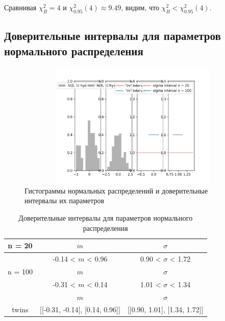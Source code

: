 \documentclass[main.tex]{subfiles}
\begin{document}
\noindent Сравнивая $\chi^{2}_{B} = 4$ и $\chi^{2}_{0.95}(4) \approx 9.49$, видим, что $\chi^{2}_{B} < \chi^{2}_{0.95}(4)$.

\FloatBarrier
\subsection{Доверительные интервалы для параметров нормального распределения}
\begin{figure}[ht]
	\centering
	\includegraphics[width = 18cm, height = 6cm]{../images/interval/8_1.png}
	\caption{Гистограммы нормальных распределений и доверительные интервалы их параметров}
	\label{w_pert1}
\end{figure}

\begin{table}[ht]
	\centering
	\begin{tabular}{| c | c | c |}
		\hline
		n = 20   &  $m$  & $\sigma$\\ \hline
		&  -0.14 < $m$ < 0.96 & 0.90 < $\sigma$ < 1.72 \\ \hline
		n = 100   &  $m$  & $\sigma$\\ \hline
		& -0.31 < $m$ < 0.14 & 1.01 < $\sigma$ < 1.34 \\ \hline
		& $m$ & $\sigma$\\ \hline
		twins & [[-0.31, -0.14], [0.14, 0.96]] & [[0.90, 1.01], [1.34, 1.72]] \\
		\hline
	\end{tabular}
	\caption{Доверительные интервалы для параметров нормального распределения}
	\label{tab:interv_simple}
\end{table}

\FloatBarrier
\end{document}
